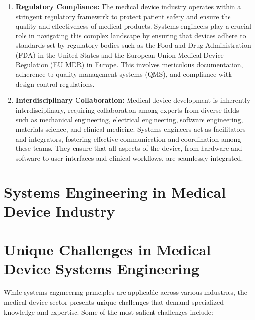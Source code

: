 \documentclass[conference]{IEEEtran}
\begin{document}
\begin{enumerate}
        \item \textbf{Regulatory Compliance:} The medical device industry 
        operates within a stringent regulatory framework to protect patient 
        safety and ensure the quality and effectiveness of medical products. 
        Systems engineers play a crucial role in navigating this complex 
        landscape by ensuring that devices adhere to standards set by 
        regulatory bodies such as the Food and Drug Administration (FDA) 
        in the United States and the European Union Medical Device 
        Regulation (EU MDR) in Europe. This involves meticulous 
        documentation, adherence to quality management systems (QMS), 
        and compliance with design control regulations.

        \item \textbf{Interdisciplinary Collaboration:} Medical device 
        development is inherently interdisciplinary, requiring 
        collaboration among experts from diverse fields such as 
        mechanical engineering, electrical engineering, software 
        engineering, materials science, and clinical medicine. Systems 
        engineers act as facilitators and integrators, fostering 
        effective communication and coordination among these teams. 
        They ensure that all aspects of the device, from hardware 
        and software to user interfaces and clinical workflows, are 
        seamlessly integrated.
    \end{enumerate}

\section{Systems Engineering in Medical Device Industry}

\section{Unique Challenges in Medical Device Systems Engineering}

    While systems engineering principles are applicable across various 
    industries, the medical device sector presents unique challenges that 
    demand specialized knowledge and expertise. Some of the most salient 
    challenges include:
\end{document}
